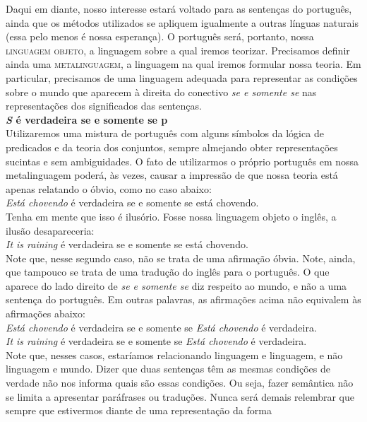 Daqui em diante, nosso interesse estará voltado para as
sen\-ten\-ças do português, ainda que os métodos utilizados se
apliquem igualmente a outras línguas naturais (essa pelo menos é
nossa esperança). O português será, portanto, nossa
\textsc{linguagem objeto}, a linguagem sobre a qual
iremos teorizar. Precisamos definir ainda uma
\textsc{metalinguagem}, a linguagem na qual iremos
formular nossa teoria. Em particular, precisamos de uma linguagem
adequada para representar as condi\-çõ\-es sobre o mundo que
aparecem à direita do conectivo \textit{se e somente se}  nas
representa\-çõ\-es dos significados das sen\-ten\-ças.\\

\n \textbf{\textit{S} é verdadeira se e somente se
p}\\

\n Utilizaremos uma mistura de português com alguns
símbolos da lógica de predicados e da teoria dos conjuntos, sempre
almejando obter representa\-çõ\-es sucintas e
sem ambiguidades. O fato de utilizarmos o próprio português em
nossa metalinguagem poderá, às vezes, causar a impressão de que
nossa teoria está apenas relatando o óbvio, como no caso
abaixo:\\

\noindent \textit{Está chovendo} é verdadeira se e somente se
está chovendo.\\

\n Tenha em mente que isso é ilusório. Fosse nossa linguagem
objeto o inglês, a ilusão desapareceria:\\

\noindent \textit{It is raining} é verdadeira se e somente se
está chovendo.\\

\noindent Note que, nesse segundo caso, não se trata de uma
afirma\-ção óbvia. Note, ainda, que tampouco se trata de uma
tradu\-ção do inglês para o português. O que aparece do lado
direito de \textit{se e somente se} diz respeito ao mundo, e não a
uma sentença do português. Em outras palavras, as afirma\-çõ\-es
acima não equivalem às afirmações abaixo:\\

\noindent \textit{Está chovendo} é verdadeira se e somente se \textit{Está
chovendo} é verdadeira.\\

\noindent \textit{It is raining} é verdadeira se e somente se \textit{Está
chovendo} é verdadeira.\\

\n Note que, nesses casos, estaríamos relacionando linguagem e linguagem, e não linguagem e mundo. Dizer que duas sentenças têm as mesmas condições de verdade não nos informa quais são essas condições. Ou seja, fazer semântica não se limita a apresentar paráfrases ou traduções. Nunca será demais relembrar que sempre que estivermos diante de
uma representa\-ção da forma\\

